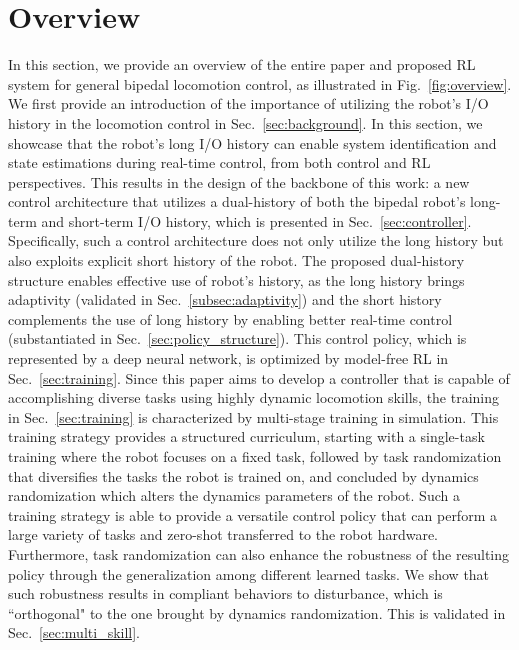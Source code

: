 \section{Overview}\label{sec:overview}
In this section, we provide an overview of the entire paper and proposed RL system for general bipedal locomotion control, as illustrated in Fig.~\ref{fig:overview}. 
We first provide an introduction of the importance of utilizing the robot's I/O history in the locomotion control in Sec.~\ref{sec:background}. In this section, we showcase that the robot's long I/O history can enable system identification and state estimations during real-time control, from both control and RL perspectives.
This results in the design of the backbone of this work: a new control architecture that utilizes a dual-history of both the bipedal robot's long-term and short-term I/O history, which is presented in Sec.~\ref{sec:controller}. 
Specifically, such a control architecture does not only utilize the long history but also exploits explicit short history of the robot.
The proposed dual-history structure enables effective use of robot's history, as the long history brings adaptivity (validated in Sec.~\ref{subsec:adaptivity}) and the short history complements the use of long history by enabling better real-time control (substantiated in Sec.~\ref{sec:policy_structure}). 
This control policy, which is represented by a deep neural network, is optimized by model-free RL in Sec.~\ref{sec:training}.
Since this paper aims to develop a controller that is capable of accomplishing diverse tasks using highly dynamic locomotion skills, the training in Sec.~\ref{sec:training} is characterized by multi-stage training in simulation. 
This training strategy provides a structured curriculum, starting with a single-task training where the robot focuses on a fixed task, followed by task randomization that diversifies the tasks the robot is trained on, and concluded by dynamics randomization which alters the dynamics parameters of the robot.
Such a training strategy is able to provide a versatile control policy that can perform a large variety of tasks and zero-shot transferred to the robot hardware.
Furthermore, task randomization can also enhance the robustness of the resulting policy through the generalization among different learned tasks. We show that such robustness results in compliant behaviors to disturbance, which is “orthogonal" to the one brought by dynamics randomization. This is validated in Sec.~\ref{sec:multi_skill}.


